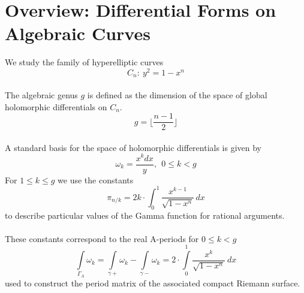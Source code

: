 \documentclass[sn-mathphys]{sn-jnl}%
\theoremstyle{thmstyleone}%
\theoremstyle{thmstyletwo}%
\theoremstyle{thmstylethree}%
\begin{document}
\section{Overview: Differential Forms on Algebraic Curves}
We study the family of hyperelliptic curves
\begin{equation}
C_n : \ y^2 = 1 - x^n
\end{equation} \\
The algebraic genus $g$ is defined as the dimension of the space of global holomorphic differentials on $C_n$.
\begin{equation}
g = \lfloor\frac{n-1}{2}\rfloor
\end{equation} \\
A standard basis for the space of holomorphic differentials is given by
\begin{equation}
\omega_k = \frac{x^k dx}{y}, \ \ 0 \leq k < g 
\end{equation}
For $1 \leq k \leq g$ we use the constants
\begin{equation}
\pi_{n / k} = 2k \cdot \int_{0}^{1}\frac{x^{k-1}}{\sqrt{1 - x^n}}\,dx
\end{equation} 
to describe particular values of the Gamma function for rational arguments. \\ \\
These constants correspond to the real A-periods for $0 \leq k < g$
\begin{equation}
\int \limits_{\Gamma_{A}} \omega_{k} = \int \limits_{\gamma +} \omega_{k} - \int \limits_{\gamma -} \omega_{k} = 2 \cdot \int \limits_{0}^{1} \frac{x^k}{\sqrt{1 - x^n}} \ dx
\end{equation}
used to construct the period matrix of the associated compact Riemann surface.
\end{document}
